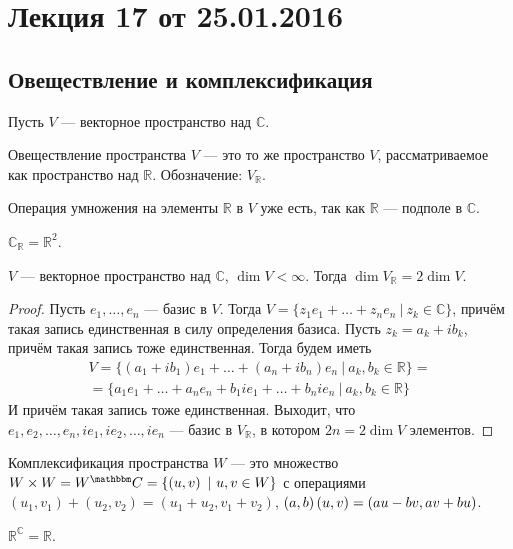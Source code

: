 


\section{Лекция 17 от 25.01.2016}
\subsection{Овеществление и комплексификация}
Пусть $V$ --- векторное пространство над $\mathbb{C}$.
\begin{Def}
Овеществление пространства $V$ --- это то же пространство $V$, рассматриваемое как пространство над $\mathbb{R}$. Обозначение: $V_\mathbb{R}$.
\end{Def}
Операция умножения на элементы $\mathbb{R}$ в $V$ уже есть, так как $\mathbb{R}$ --- подполе в $\mathbb{C}$.

\begin{Examples}
$\mathbb{C}_\mathbb{R} = \mathbb{R}^2$.
\end{Examples}
\begin{Suggestion}
$V$ --- векторное пространство над $\mathbb{C}$, $\dim V < \infty$. Тогда $\dim V_\mathbb{R} = 2\dim V$.
\end{Suggestion}
\begin{proof}
Пусть $e_1, \ldots, e_n$ --- базис в $V$. Тогда $V = \{z_1e_1 + \ldots + z_ne_n\ |\ z_k \in \mathbb{C}\}$, причём такая запись единственная в силу определения базиса. Пусть $z_k = a_k+ib_k$, причём такая запись тоже единственная. Тогда будем иметь
\begin{gather*}
V = \{ \left(a_1+ib_1\right)e_1 + \ldots + \left(a_n+ib_n\right)e_n\ |\ a_k, b_k \in \mathbb{R}\} =\\
= \{a_1e_1 + \ldots + a_ne_n + b_1ie_1 + \ldots + b_nie_n\ |\ a_k, b_k \in \mathbb{R}\}
\end{gather*}
И причём такая запись тоже единственная. Выходит, что $e_1, e_2, \ldots, e_n, ie_1, ie_2, \ldots, ie_n$ --- базис в $V_\mathbb{R}$, в котором $2n = 2\dim V$ элементов.
\end{proof}
\begin{Def}
Комплексификация пространства $W$ --- это множество $W\times W = W^\mathbb{C} \hm{=} \{\left( u, v\right)\ |\ u,v \in W\}$ с операциями $\left(u_1, v_1\right) + \left(u_2, v_2\right) = \left(u_1+u_2, v_1+v_2\right)$, $\left(a, b\right)\left(u, v\right) \hm{=} \left(au-bv, av+bu\right)$.
\end{Def}
\begin{Examples}
$\mathbb{R}^\mathbb{C} = \mathbb{R}$.
\end{Examples}


